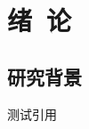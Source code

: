 


\newcommand{\citeA}[1]{\citeauthor{#1}\cite{#1}}

\chapter{绪~论}

\section{研究背景}
\citeA{whitcomb1991}

测试引用\cite{humuyuan2015}\cite{humuyuan2015-2}\cite{hutengyue2014}\cite{whitcomb1991}

\cite{humuyuan2015,humuyuan2015-2,hutengyue2014,whitcomb1991}